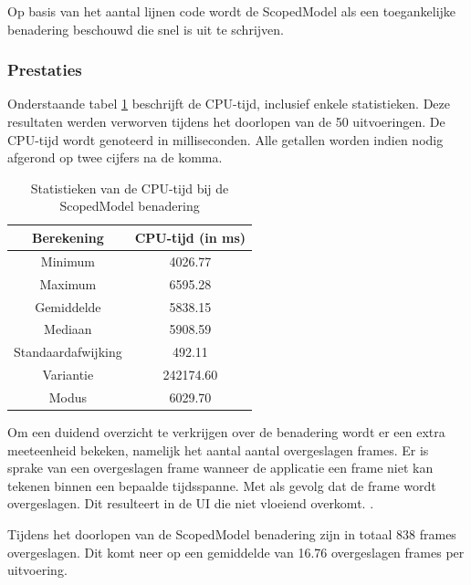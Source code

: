 Op basis van het aantal lijnen code wordt de ScopedModel als een toegankelijke benadering beschouwd die snel is uit te schrijven.

\subsubsection{Prestaties}
Onderstaande tabel \ref{table:experiment-scopedmodel-statistics} beschrijft de CPU-tijd, inclusief enkele statistieken. Deze resultaten werden verworven tijdens het doorlopen van de 50 uitvoeringen. De CPU-tijd wordt genoteerd in milliseconden. Alle getallen worden indien nodig afgerond op twee cijfers na de komma.
\begin{table}[H]
    \centering
    \begin{tabular}{c|c}
        \textbf{Berekening} & \textbf{CPU-tijd (in ms)}  \\ \hline
        Minimum             & 4026.77                    \\ \hline
        Maximum             & 6595.28                    \\ \hline
        Gemiddelde          & 5838.15                    \\ \hline
        Mediaan             & 5908.59                    \\ \hline
        Standaardafwijking  & 492.11                     \\ \hline
        Variantie           & 242174.60                  \\ \hline
        Modus               & 6029.70                      \\                
    \end{tabular}
    \caption{Statistieken van de CPU-tijd bij de ScopedModel benadering}
    \label{table:experiment-scopedmodel-statistics}
\end{table}

Om een duidend overzicht te verkrijgen over de benadering wordt er een extra meeteenheid bekeken, namelijk het aantal aantal overgeslagen frames. Er is sprake van een overgeslagen frame wanneer de applicatie een frame niet kan tekenen binnen een bepaalde tijdsspanne. Met als gevolg dat de frame wordt overgeslagen. Dit resulteert in de UI die niet vloeiend overkomt. \autocite{Flutter2019d}.

Tijdens het doorlopen van de ScopedModel benadering zijn in totaal 838 frames overgeslagen. Dit komt neer op een gemiddelde van 16.76 overgeslagen frames per uitvoering.

